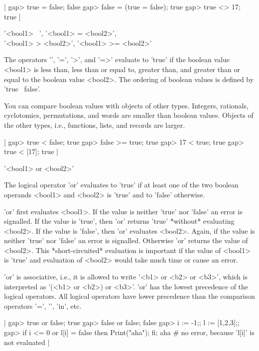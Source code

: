 |    gap> true = false;
    false
    gap> false = (true = false);
    true
    gap> true <> 17;
    true |

'<bool1> \<\ <bool2>', '<bool1> \<= <bool2>',\\
'<bool1>  > <bool2>', '<bool1>  >= <bool2>'

The operators  '\<', '\<=',  '>', and   '=>'  evaluate to 'true'  if  the
boolean value <bool1> is less than, less than  or equal to, greater than,
and greater than or equal to the  boolean value <bool2>.  The ordering of
boolean values is defined by 'true \<\ false'.

You can compare  boolean values  with objects of other  types.  Integers,
rationals, cyclotomics, permutations, and  words are smaller than boolean
values.  Objects of the other types, i.e., functions, lists,  and records
are larger.

|    gap> true < false;
    true
    gap> false >= true;
    true
    gap> 17 < true;
    true
    gap> true < [17];
    true |

%
%

'<bool1> or <bool2>'

The logical operator 'or' evaluates to 'true' if at  least one of the two
boolean operands <bool1> and <bool2> is  'true' and to 'false' otherwise.

'or' first evaluates <bool1>.  If the value is neither 'true' nor 'false'
an error is signalled.  If the value is 'true', then  'or' returns 'true'
*without*  evaluating  <bool2>.   If  the value  is  'false',  then  'or'
evaluates <bool2>.  Again, if the value is neither 'true'  nor 'false' an
error is signalled.  Otherwise 'or' returns  the value  of <bool2>.  This
*short-circuited* evaluation  is important if   the value of  <bool1>  is
'true' and evaluation of <bool2> would take much time or cause an error.

'or' is associative, i.e., it is allowed to write '<b1> or <b2> or <b3>',
which is interpreted as  '(<b1> or <b2>) or <b3>'.   'or' has the  lowest
precedence  of the logical  operators.   All logical operators have lower
precedence than the comparison operators '=', '\<', 'in', etc.

|    gap> true or false;
    true
    gap> false or false;
    false
    gap> i := -1;;  l := [1,2,3];;
    gap> if i <= 0 or l[i] = false  then Print("aha\n");  fi;
    aha    # no error, because 'l[i]' is not evaluated |

